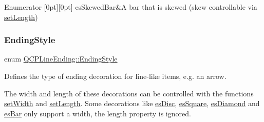 \begin{DoxyEnumFields}{Enumerator}
[0pt][0pt]{}\mbox{\label{class_q_c_p_line_ending_a5ef16e6876b4b74959c7261d8d4c2cd5a2d5490a55ff209f2443501a7f5328aab}} 
es\+Skewed\+Bar&A bar that is skewed (skew controllable via \hyperlink{class_q_c_p_line_ending_ae36fa01763751cd64b7f56c3507e935a}{set\+Length}) \\
\hline

\end{DoxyEnumFields}
\mbox{\label{class_q_c_p_line_ending_a5ef16e6876b4b74959c7261d8d4c2cd5}} 
\subsubsection{\texorpdfstring{Ending\+Style}{EndingStyle}\hspace{0.1cm}{\footnotesize\ttfamily [2/2]}}
{\footnotesize\ttfamily enum \hyperlink{class_q_c_p_line_ending_a5ef16e6876b4b74959c7261d8d4c2cd5}{Q\+C\+P\+Line\+Ending\+::\+Ending\+Style}}

Defines the type of ending decoration for line-\/like items, e.\+g. an arrow.



The width and length of these decorations can be controlled with the functions \hyperlink{class_q_c_p_line_ending_a26dc020ea985a72cc25881ce2115e34e}{set\+Width} and \hyperlink{class_q_c_p_line_ending_ae36fa01763751cd64b7f56c3507e935a}{set\+Length}. Some decorations like \hyperlink{class_q_c_p_line_ending_a5ef16e6876b4b74959c7261d8d4c2cd5a4e7a48003d59b1eed00767e879440600}{es\+Disc}, \hyperlink{class_q_c_p_line_ending_a5ef16e6876b4b74959c7261d8d4c2cd5a8b0298e645008220cbc6cef9d05eb950}{es\+Square}, \hyperlink{class_q_c_p_line_ending_a5ef16e6876b4b74959c7261d8d4c2cd5a0a9e21dfaf144c9b8ae41711f61199e3}{es\+Diamond} and \hyperlink{class_q_c_p_line_ending_a5ef16e6876b4b74959c7261d8d4c2cd5a1683a6a39898f53737ee21d4fedba791}{es\+Bar} only support a width, the length property is ignored.

